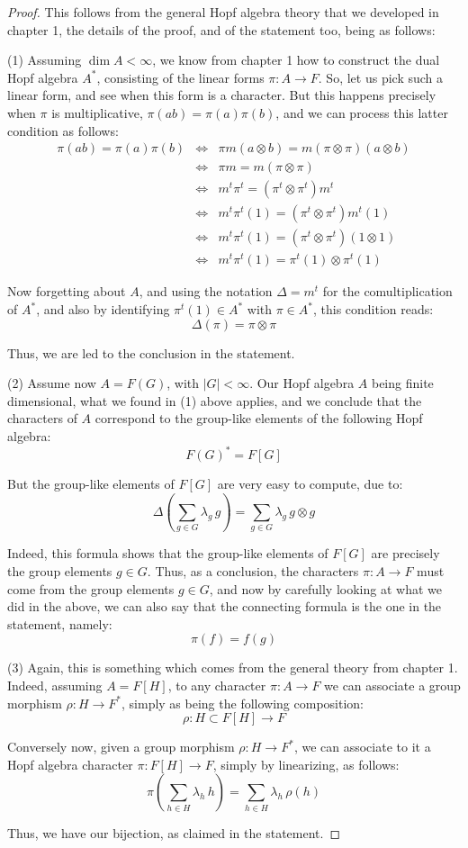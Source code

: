 \documentclass[12pt]{amsbook}
\begin{document}
\begin{proof}
This follows from the general Hopf algebra theory that we developed in chapter 1, the details of the proof, and of the statement too, being as follows:

\medskip

(1) Assuming $\dim A<\infty$, we know from chapter 1 how to construct the dual Hopf algebra $A^*$, consisting of the linear forms $\pi:A\to F$. So, let us pick such a linear form, and see when this form is a character. But this happens precisely when $\pi$ is multiplicative, $\pi(ab)=\pi(a)\pi(b)$, and we can process this latter condition as follows:
\begin{eqnarray*}
\pi(ab)=\pi(a)\pi(b)
&\iff&\pi m(a\otimes b)=m(\pi\otimes\pi)(a\otimes b)\\
&\iff&\pi m=m(\pi\otimes\pi)\\
&\iff&m^t\pi^t=(\pi^t\otimes\pi^t)m^t\\
&\iff&m^t\pi^t(1)=(\pi^t\otimes\pi^t)m^t(1)\\
&\iff&m^t\pi^t(1)=(\pi^t\otimes\pi^t)(1\otimes1)\\
&\iff&m^t\pi^t(1)=\pi^t(1)\otimes\pi^t(1)
\end{eqnarray*}

Now forgetting about $A$, and using the notation $\Delta=m^t$ for the comultiplication of $A^*$, and also by identifying $\pi^t(1)\in A^*$ with $\pi\in A^*$, this condition reads:
$$\Delta(\pi)=\pi\otimes\pi$$

Thus, we are led to the conclusion in the statement.

\medskip

(2) Assume now $A=F(G)$, with $|G|<\infty$. Our Hopf algebra $A$ being finite dimensional, what we found in (1) above applies, and we conclude that the characters of $A$ correspond to the group-like elements of the following Hopf algebra:
$$F(G)^*=F[G]$$

But the group-like elements of $F[G]$ are very easy to compute, due to:
$$\Delta\left(\sum_{g\in G}\lambda_g\,g\right)=\sum_{g\in G}\lambda_g\,g\otimes g$$

Indeed, this formula shows that the group-like elements of $F[G]$ are precisely the group elements $g\in G$. Thus, as a conclusion, the characters $\pi:A\to F$ must come from the group elements $g\in G$, and now by carefully looking at what we did in the above, we can also say that the connecting formula is the one in the statement, namely:
$$\pi(f)=f(g)$$

(3) Again, this is something which comes from the general theory from chapter 1. Indeed, assuming $A=F[H]$, to any character $\pi:A\to F$ we can associate a group morphism $\rho:H\to F^*$, simply as being the following composition:
$$\rho:H\subset F[H]\to F$$

Conversely now, given a group morphism $\rho:H\to F^*$, we can associate to it a Hopf algebra character $\pi:F[H]\to F$, simply by linearizing, as follows:
$$\pi\left(\sum_{h\in H}\lambda_h\,h\right)=\sum_{h\in H}\lambda_h\,\rho(h)$$

Thus, we have our bijection, as claimed in the statement.
\end{proof}
\end{document}
